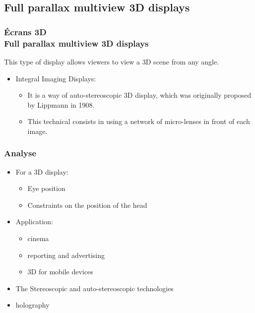 \subsection{Full parallax multiview 3D displays} 
\begin{frame}
  \frametitle{Écrans 3D \\Full parallax multiview 3D displays} 
  
This type of display allows viewers to view a 3D scene from any angle.\\
  
  \begin{itemize}
  \item Integral Imaging Displays:
    
    \begin{itemize}
    \item It is a way of auto-stereoscopic 3D display, which was originally proposed by Lippmann in 1908.

    \item This technical consists in using a network of micro-lenses in front of each image.

    \end{itemize}
  \end{itemize}
  
\end{frame}
\begin{frame}
  \frametitle{Analyse} 
  
  \begin{itemize}
  \item For a 3D display:
    \begin{itemize}
    \item Eye position
    \item Constraints on the position of the head
    \end{itemize}
  \end{itemize}

  \begin{itemize}
  \item Application:
    \begin{itemize}
    \item cinema
    \item reporting and advertising
    \item 3D for mobile devices
    \end{itemize}
  \end{itemize}
  \begin{itemize}
  \item The Stereoscopic  and auto-stereoscopic technologies
  \item holography
  \end{itemize}
\end{frame}


